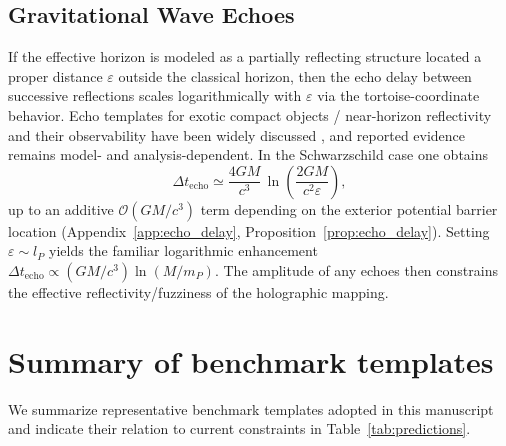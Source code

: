 \subsection{Gravitational Wave Echoes}
If the effective horizon is modeled as a partially reflecting structure located a proper distance $\varepsilon$ outside the classical horizon, then the echo delay between successive reflections scales logarithmically with $\varepsilon$ via the tortoise-coordinate behavior. Echo templates for exotic compact objects / near-horizon reflectivity and their observability have been widely discussed \cite{CardosoFranzinPani2016Ringdown,AbediDykaarAfshordi2017Echoes}, and reported evidence remains model- and analysis-dependent. In the Schwarzschild case one obtains
\begin{equation}
    \Delta t_{\mathrm{echo}} \simeq \frac{4GM}{c^3}\,\ln\!\left(\frac{2GM}{c^2\varepsilon}\right),
\end{equation}
up to an additive $\mathcal{O}(GM/c^3)$ term depending on the exterior potential barrier location (Appendix~\ref{app:echo_delay}, Proposition~\ref{prop:echo_delay}). Setting $\varepsilon\sim l_P$ yields the familiar logarithmic enhancement $\Delta t_{\mathrm{echo}}\propto (GM/c^3)\ln(M/m_P)$. The amplitude of any echoes then constrains the effective reflectivity/fuzziness of the holographic mapping.

\section{Summary of benchmark templates}
\label{chap:summary_table}

We summarize representative benchmark templates adopted in this manuscript and indicate their relation to current constraints in Table~\ref{tab:predictions}.


